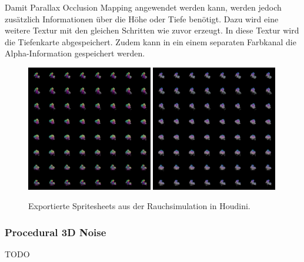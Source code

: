 Damit Parallax Occlusion Mapping angewendet werden kann, werden jedoch zusätzlich Informationen über die Höhe oder Tiefe benötigt.
Dazu wird eine weitere Textur mit den gleichen Schritten wie zuvor erzeugt. In diese Textur wird die Tiefenkarte abgespeichert. Zudem kann in ein einem separaten
Farbkanal die Alpha-Information gespeichert werden.



\begin{figure}[h!]
	\centering
	\includegraphics[width=0.49\textwidth]{Grafiken/Implementation/Lightmaps/smokeSim_T1.png}
	\includegraphics[width=0.49\textwidth]{Grafiken/Implementation/Lightmaps/smokeSim_T2.png}
	\begin{footnotesize}
		\caption{Exportierte Spritesheets aus der Rauchsimulation in Houdini. }
		\label{fig:flipbook}
	\end{footnotesize}
\end{figure}





\subsubsection{Procedural 3D Noise}
TODO



